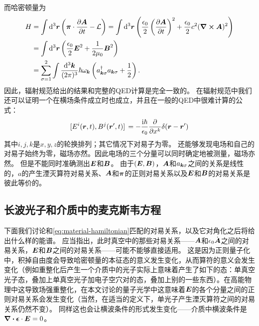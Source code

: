 而哈密顿量为
\begin{equation}
    \begin{aligned}
        H &= \int \dd[3]{\vb*{r}} \left(\vb*{\pi} \cdot \pdv{\vb*{A}}{t} - \mathcal{L} \right) = \int \dd[3]{\vb*{r}} \left( \frac{\epsilon_0}{2} \left(\pdv{\vb*{A}}{t}\right)^2 + \frac{\epsilon_0}{2} c^2 (\curl{\vb*{A}})^2 \right) \\
        &= \int \dd[3]{\vb*{r}} \left( \frac{\epsilon_0}{2} \vb*{E}^2 + \frac{1}{2\mu_0} \vb*{B}^2 \right) \\
        &= \sum_{\sigma=1}^2 \int \frac{\dd[3]{\vb*{k}}}{(2\pi)^3} \hbar \omega_{\vb*{k}} \left(a^\dagger_{\vb*{k} \sigma} a_{\vb*{k} \sigma} + \frac{1}{2} \right).
    \end{aligned}
\end{equation}
因此，辐射规范给出的结果和完整的QED计算是完全一致的。
在辐射规范中我们还可以证明一个在横场条件成立时也成立，并且在一般的QED中很难计算的公式：
\begin{equation}
    \comm*{E^i(\vb*{r}, t)}{B^j(\vb*{r}', t)} = - \frac{\ii \hbar}{\epsilon_0} \pdv{x^k} \delta(\vb*{r} - \vb*{r}')
\end{equation}
其中$i, j, k$是$x, y, z$的轮换排列；其它情况下对易子为零。
还能够发现电场和自己的对易子始终为零，磁场亦然。因此电场的三个分量可以同时确定地被测量，磁场亦然。
但是不能同时准确测出$\vb*{E}$和$\vb*{B}$。
由于$(\vb*{E}, \vb*{B})$，$\vb*{A}$和$a_{\vb*{k} \sigma}$之间的关系是线性的，$a$的产生湮灭算符对易关系、$\vb*{A}$和$\vb*{\pi}$的正则对易关系以及$\vb*{E}$和$\vb*{B}$的对易关系是彼此等价的。



\subsection{长波光子和介质中的麦克斯韦方程}\label{sec:long-wavelength-photon-maxwell-general}

下面我们讨论和\eqref{eq:material-hamiltonian}匹配的对易关系，以及它对角化之后将给出什么样的能谱。
应当指出，此时真空中的那些对易关系——$\vb*{A}$和$\epsilon_0 \dot{\vb*{A}}$之间的对易关系，$\vb*{E}$和$\vb*{B}$之间的对易关系——可能不能够直接适用。
这是因为正则量子化中，积掉自由度会导致哈密顿量的本征态的意义发生变化，从而算符的意义会发生变化（例如重整化后产生一个介质中的光子实际上意味着产生了如下的态：单真空光子态，叠加上单真空光子加电子空穴对的态，叠加上别的一些东西）。在高能物理中这导致场强重整化，在本文讨论的量子光学中这意味着$\vb*{E}$的各个分量之间的正则对易关系会发生变化（当然，在适当的定义下，单光子产生湮灭算符之间的对易关系仍然不变）。
同样这也会让横波条件的形式发生变化——介质中横波条件是$\div{\vb*{\epsilon} \cdot \vb*{E}} = 0$。

